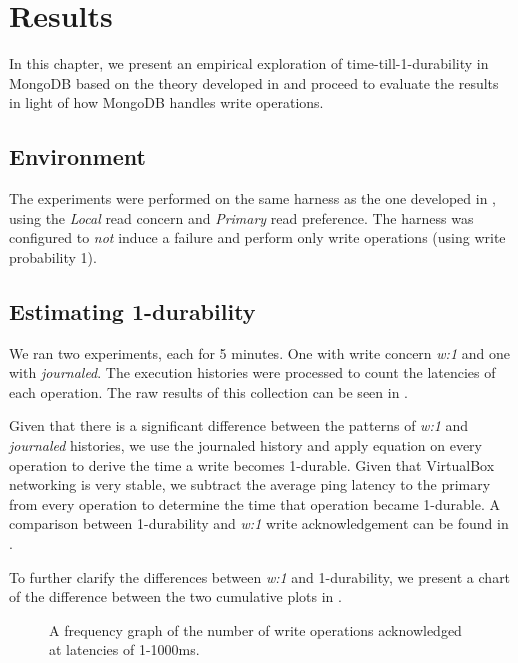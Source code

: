 \chapter{Results} \label{chap:kdur-results}

In this chapter, we present an empirical exploration of time-till-1-durability in MongoDB based on the theory developed in  and proceed to evaluate the results in light of how MongoDB handles write operations.

\section{Environment}
The experiments were performed on the same harness as the one developed in , using the \textit{Local} read concern and \textit{Primary} read preference. The harness was configured to \textit{not} induce a failure and perform only write operations (using write probability 1). 

\section{Estimating 1-durability}
We ran two experiments, each for 5 minutes. One with write concern \textit{w:1} and one with \textit{journaled}. The execution histories were processed to count the latencies of each operation. The raw results of this collection can be seen in .

Given that there is a significant difference between the patterns of \textit{w:1} and \textit{journaled} histories, we use the journaled history and apply equation  on every operation to derive the time a write becomes 1-durable. Given that VirtualBox networking is very stable, we subtract the average ping latency to the primary from every operation to determine the time that operation became 1-durable. A comparison between 1-durability and \textit{w:1} write acknowledgement can be found in .

To further clarify the differences between \textit{w:1} and 1-durability, we present a chart of the difference between the two cumulative plots in .

\begin{figure}
    \centering        
    
    \label{fig:latencies}
    \caption{A frequency graph of the number of write operations acknowledged at latencies of 1-1000ms.}
\end{figure}

